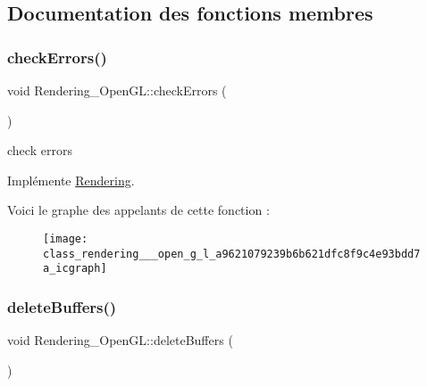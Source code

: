 \subsection{Documentation des fonctions membres}
\mbox{\label{class_rendering___open_g_l_a9621079239b6b621dfc8f9c4e93bdd7a}} 
\subsubsection{\texorpdfstring{check\+Errors()}{checkErrors()}}
{\footnotesize\ttfamily void Rendering\+\_\+\+Open\+G\+L\+::check\+Errors (\begin{DoxyParamCaption}{ }\end{DoxyParamCaption})\hspace{0.3cm}{\ttfamily [virtual]}}



check errors 



Implémente \hyperlink{class_rendering_a93693702cf5a7709a7b1ddc7a7d3d8d3}{Rendering}.

Voici le graphe des appelants de cette fonction \+:\nopagebreak
\begin{figure}[H]
\begin{center}
\leavevmode
\texttt{[image: class\_rendering\_\_\_open\_g\_l\_a9621079239b6b621dfc8f9c4e93bdd7a\_icgraph]}
\end{center}
\end{figure}
\mbox{\label{class_rendering___open_g_l_aab5b195bb52751243f4944417f9ae7d5}} 
\subsubsection{\texorpdfstring{delete\+Buffers()}{deleteBuffers()}}
{\footnotesize\ttfamily void Rendering\+\_\+\+Open\+G\+L\+::delete\+Buffers (\begin{DoxyParamCaption}{ }\end{DoxyParamCaption})\hspace{0.3cm}{\ttfamily [virtual]}}



